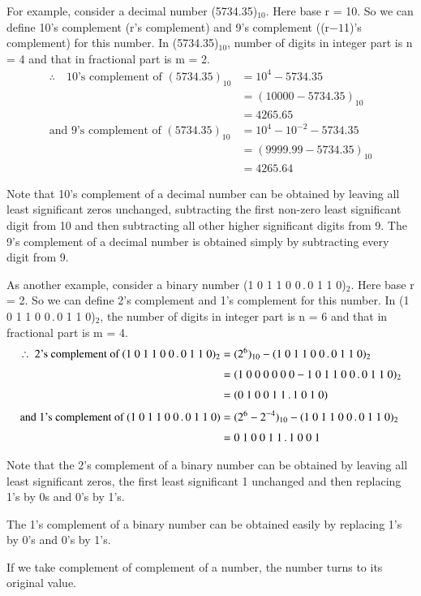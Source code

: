 For example, consider a decimal number (5734.35)$_{10}$. Here base r = 10. So we can define 10's complement (r's complement) and 9's complement ((r$-1$1)'s complement) for this number. In (5734.35)$_{10}$, number of digits in integer part is n = 4 and that in fractional part is m = 2.
\begin{align*}
\therefore\quad \text{10's complement of } (5734.35)_{10} &= 10^{4}-5734.35\\[3pt]
 &= (10000-5734.35)_{10}\\[3pt]
 &= 4265.65\\[3pt]
\text{and 9's complement of } (5734.35)_{10} &= 10^{4}-10^{-2}-5734.35\\[3pt]
&= (9999.99-5734.35)_{10}\\[3pt]
&= 4265.64
\end{align*}

Note that 10's complement of a decimal number can be obtained by leaving all least significant zeros unchanged, subtracting the first non-zero least significant digit from 10 and then subtracting all other higher significant digits from 9. The 9's complement of a decimal number is obtained simply by subtracting every digit from 9.

As another example, consider a binary number (1 0 1 1 0 0\,.\,0 1 1 0)$_{2}$. Here base r = 2. So we can define 2's complement and 1's complement for this number. In (1 0 1 1 0 0\,.\,0 1 1 0)$_{2}$, the number of digits in integer part is n = 6 and that in fractional part is m = 4.
\begin{align*}
\therefore~ \text{2's complement of } (1~0~1~1~0~0\,.\,0~1~1~0)_{2} &= (2^{6})_{10}-(1~0~1~1~0~0\,.\,0~1~1~0)_{2}\\[3pt]
&= (1~0~0~0~0~0~0 - 1~0~1~1~0~0\,.\,0~1~1~0)_{2}\\[3pt]
&= (0~1~0~0~1~1\,.\,1~0~1~0)\\[3pt]
\text{and 1's complement of (1 0 1 1 0 0\,.\,0 1 1 0)} &=(2^{6}-2^{-4})_{10}-(1~0~1~1~0~0\,.\,0~1~1~0)_{2}\\[3pt]
&= 0~1~0~0~1~1\,.\,1~0~0~1
\end{align*}

Note that the 2's complement of a binary number can be obtained by leaving all least significant zeros, the first least significant 1 unchanged and then replacing 1's by 0s and 0's by 1's.

The 1's complement of a binary number can be obtained easily by replacing 1's by 0's and 0's by 1's.

\begin{note}
If we take complement of complement of a number, the number turns to its original value.
\end{note}

